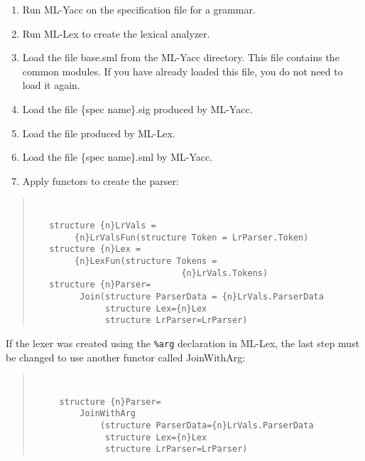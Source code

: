 \begin{enumerate}

\item Run ML-Yacc on the specification file for a grammar.
\item Run ML-Lex to create the lexical analyzer.
\item Load the file base.sml from the ML-Yacc directory.  This file contains
the common modules.  If you have already loaded this file, you do not need
to load it again.
\item Load the file \{spec name\}.sig produced by ML-Yacc.
\item Load the file produced by ML-Lex.
\item Load the file \{spec name\}.sml by ML-Yacc.
\item Apply functors to create the parser:

\end{enumerate}
\begin{quote}
\tt
\begin{verbatim}
   structure {n}LrVals =
        {n}LrValsFun(structure Token = LrParser.Token)
   structure {n}Lex = 
        {n}LexFun(structure Tokens = 
                             {n}LrVals.Tokens)
   structure {n}Parser=
         Join(structure ParserData = {n}LrVals.ParserData
              structure Lex={n}Lex
              structure LrParser=LrParser)
\end{verbatim}
\end{quote}
If the lexer was created using the {\tt \%arg} declaration in ML-Lex,
the last step
must be changed to use another functor called JoinWithArg:
\begin{quote}
\tt
\begin{verbatim}
     structure {n}Parser=
         JoinWithArg
             (structure ParserData={n}LrVals.ParserData
              structure Lex={n}Lex
              structure LrParser=LrParser)
\end{verbatim}
\end{quote}


